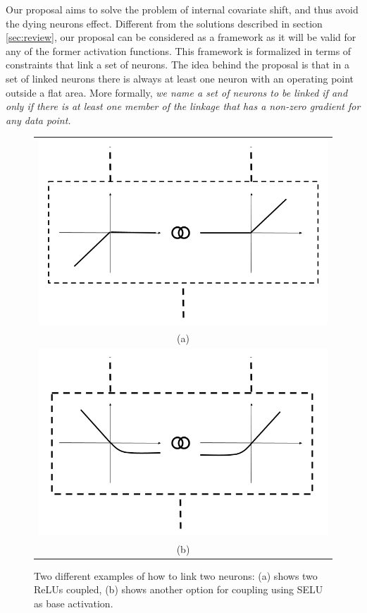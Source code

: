 \documentclass[10pt,twocolumn,letterpaper]{article}
\begin{document}
Our proposal aims to solve the problem of internal covariate shift, and thus avoid the dying neurons effect. Different from the solutions described in section \ref{sec:review}, our proposal can be considered as a framework as it will be valid for any of the former activation functions. This framework is formalized in terms of constraints that link a set of neurons. The idea behind the proposal is that in a set of linked neurons  there is always at least one neuron with an operating point outside a flat area. More formally, {\it we name a set of neurons to be linked if and only if there is at least one member of the linkage that has a non-zero gradient for any data point.} 

\begin{figure}[!h]
    \centering
    \begin{tabular}{c}
        \includegraphics[width=0.75\linewidth]{plots/coupled_neurons.png}\\
        (a)\\
        \includegraphics[width=0.75\linewidth]{plots/coupled_selu.png}\\
        (b)\\
    \end{tabular}
    \caption{Two different examples of how to link two neurons: (a) shows two ReLUs coupled, (b) shows another option for coupling using SELU as base activation.}
    \label{fig:coupling}
\end{figure}
\end{document}
